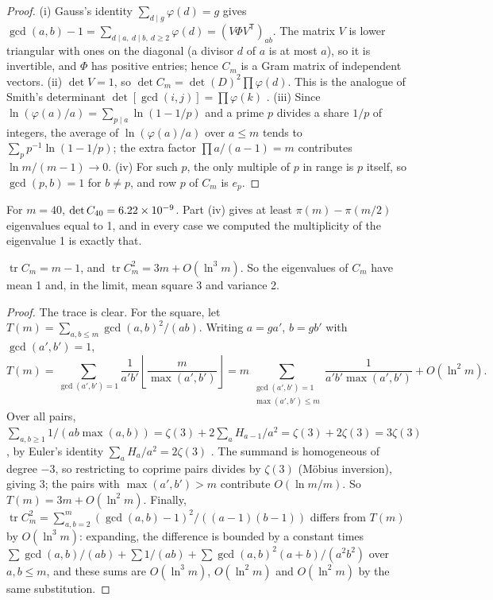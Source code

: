 \begin{proof}
(i) Gauss's identity $\sum_{d \mid g}\varphi(d) = g$ gives $\gcd(a,b) - 1 = \sum_{d \mid a,\ d\mid b,\ d \ge 2}\varphi(d) = (V\Phi V^{\mathsf T})_{ab}$. The matrix $V$ is lower triangular with ones on the diagonal (a divisor $d$ of $a$ is at most $a$), so it is invertible, and $\Phi$ has positive entries; hence $C_m$ is a Gram matrix of independent vectors. (ii) $\det V = 1$, so $\det C_m = \det(D)^2\prod\varphi(d)$. This is the analogue of Smith's determinant $\det[\gcd(i,j)] = \prod\varphi(k)$ \citep{Smith1875}. (iii) Since $\ln(\varphi(a)/a) = \sum_{p \mid a}\ln(1 - 1/p)$ and a prime $p$ divides a share $1/p$ of integers, the average of $\ln(\varphi(a)/a)$ over $a \le m$ tends to $\sum_p p^{-1}\ln(1 - 1/p)$; the extra factor $\prod a/(a-1) = m$ contributes $\ln m/(m-1) \to 0$. (iv) For such $p$, the only multiple of $p$ in range is $p$ itself, so $\gcd(p, b) = 1$ for $b \ne p$, and row $p$ of $C_m$ is $e_p$.
\end{proof}

For $m = 40$, $\det C_{40} = 6.22 \times 10^{-9}$. Part (iv) gives at least $\pi(m) - \pi(m/2)$ eigenvalues equal to 1, and in every case we computed the multiplicity of the eigenvalue 1 is exactly that.

\begin{theorem}\label{thm:oq-moments}
$\operatorname{tr} C_m = m - 1$, and $\operatorname{tr} C_m^2 = 3m + O(\ln^3 m)$. So the eigenvalues of $C_m$ have mean 1 and, in the limit, mean square 3 and variance 2.
\end{theorem}

\begin{proof}
The trace is clear. For the square, let $T(m) = \sum_{a, b \le m}\gcd(a,b)^2/(ab)$. Writing $a = ga'$, $b = gb'$ with $\gcd(a',b') = 1$,
\[
  T(m) = \sum_{\gcd(a', b') = 1}\frac{1}{a'b'}\left\lfloor\frac{m}{\max(a',b')}\right\rfloor = m\sum_{\substack{\gcd(a',b')=1\\ \max(a',b') \le m}}\frac{1}{a'b'\max(a',b')} + O(\ln^2 m).
\]
Over all pairs, $\sum_{a,b \ge 1} 1/(ab\max(a,b)) = \zeta(3) + 2\sum_{a}H_{a-1}/a^2 = \zeta(3) + 2\zeta(3) = 3\zeta(3)$, by Euler's identity $\sum_{a} H_a/a^2 = 2\zeta(3)$ \citep{FlajoletSalvy1998}. The summand is homogeneous of degree $-3$, so restricting to coprime pairs divides by $\zeta(3)$ (Möbius inversion), giving $3$; the pairs with $\max(a', b') > m$ contribute $O(\ln m/m)$. So $T(m) = 3m + O(\ln^2 m)$. Finally, $\operatorname{tr}C_m^2 = \sum_{a,b=2}^m (\gcd(a,b)-1)^2/((a-1)(b-1))$ differs from $T(m)$ by $O(\ln^3 m)$: expanding, the difference is bounded by a constant times $\sum \gcd(a,b)/(ab) + \sum 1/(ab) + \sum\gcd(a,b)^2(a+b)/(a^2b^2)$ over $a, b \le m$, and these sums are $O(\ln^3 m)$, $O(\ln^2 m)$ and $O(\ln^2 m)$ by the same substitution.
\end{proof}

